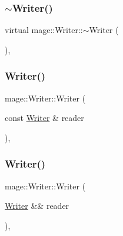 \hypertarget{classmage_1_1_writer_a04fe27246806384099d518231c75c09f}{}\label{classmage_1_1_writer_a04fe27246806384099d518231c75c09f} 
\subsubsection{\texorpdfstring{$\sim$\+Writer()}{~Writer()}}
{\footnotesize\ttfamily virtual mage\+::\+Writer\+::$\sim$\+Writer (\begin{DoxyParamCaption}{ }\end{DoxyParamCaption})\hspace{0.3cm}{\ttfamily [virtual]}, {\ttfamily [default]}}

\hypertarget{classmage_1_1_writer_a0988d427f687ad5334c2ba74993e0d6e}{}\label{classmage_1_1_writer_a0988d427f687ad5334c2ba74993e0d6e} 
\subsubsection{\texorpdfstring{Writer()}{Writer()}\hspace{0.1cm}{\footnotesize\ttfamily [2/3]}}
{\footnotesize\ttfamily mage\+::\+Writer\+::\+Writer (\begin{DoxyParamCaption}\item[{const \hyperlink{classmage_1_1_writer}{Writer} \&}]{reader }\end{DoxyParamCaption})\hspace{0.3cm}{\ttfamily [private]}, {\ttfamily [delete]}}

\hypertarget{classmage_1_1_writer_a2c8169d5fd5a5b00bf587440f2c88b7c}{}\label{classmage_1_1_writer_a2c8169d5fd5a5b00bf587440f2c88b7c} 
\subsubsection{\texorpdfstring{Writer()}{Writer()}\hspace{0.1cm}{\footnotesize\ttfamily [3/3]}}
{\footnotesize\ttfamily mage\+::\+Writer\+::\+Writer (\begin{DoxyParamCaption}\item[{\hyperlink{classmage_1_1_writer}{Writer} \&\&}]{reader }\end{DoxyParamCaption})\hspace{0.3cm}{\ttfamily [private]}, {\ttfamily [delete]}}




